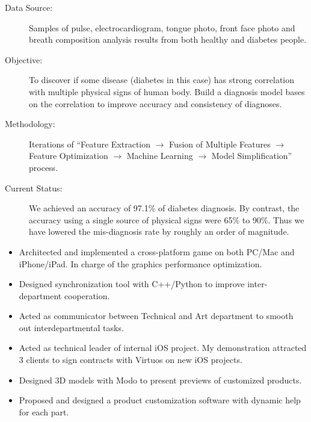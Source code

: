 \documentclass[10pt,a4paper]{moderncv/moderncv}
\begin{document}
{
\begin{description}
	\item[Data Source:] Samples of pulse, electrocardiogram, tongue photo, front face photo and breath composition analysis results from both healthy and diabetes people.
	\item[Objective:] To discover if some disease (diabetes in this case) has strong correlation with multiple physical signs of human body. Build a diagnosis model bases on the correlation to improve accuracy and consistency of diagnoses.
	\item[Methodology:] Iterations of ``Feature Extraction $\rightarrow$ Fusion of Multiple Features $\rightarrow$ Feature Optimization $\rightarrow$ Machine Learning $\rightarrow$ Model Simplification'' process.
	\item[Current Status:]  We achieved an accuracy of 97.1\% of diabetes diagnosis. By contrast, the accuracy using a single source of physical signs were 65\% to 90\%. Thus we have lowered the mis-diagnosis rate by roughly an order of magnitude.
\end{description}
}

{
\begin{itemize}
	\item Architected and implemented a cross-platform game on both PC/Mac and iPhone/iPad. In charge of the graphics performance optimization.
	\item Designed synchronization tool with C++/Python to improve inter-department cooperation.
	\item Acted as communicator between Technical and Art department to smooth out interdepartmental tasks.
	\item Acted as technical leader of internal iOS project. My demonstration attracted 3 clients to sign contracts with Virtuos on new iOS projects.
\end{itemize}
}

{
\begin{itemize}
	\item Designed 3D models with Modo to present previews of customized products.
	\item Proposed and designed a product customization software with dynamic help for each part.
\end{itemize}
}
\end{document}

